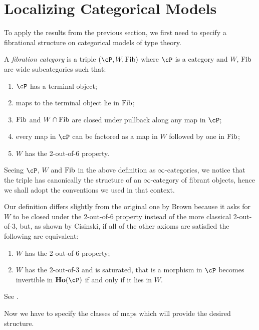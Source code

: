 \chapter{Localizing Categorical Models}

To apply the results from the previous section, we first need to specify a
fibrational structure on categorical models of type theory.

\begin{defn}
  A \emph{fibration category} is a triple $(\cP,W,\fib)$ where $\cP$ is a
  category and $W$, $\operatorname{Fib}$ are wide subcategories such that:
  \begin{enumerate}
    \item $\cP$ has a terminal object;
    \item maps to the terminal object lie in $\operatorname{Fib}$;
    \item $\operatorname{Fib}$ and $W\cap \operatorname{Fib}$ are closed under pullback along any map in $\cP$;
    \item every map in $\cP$ can be factored as a map in $W$ followed by one in
      $\operatorname{Fib}$;
    \item $W$ has the 2-out-of-6 property.
  \end{enumerate}
\end{defn}

\begin{rmk}
  Seeing $\cP$, $W$ and $\operatorname{Fib}$ in the above definition as $\infty$-categories, we
  notice that the triple has canonically the structure of an $\infty$-category
  of fibrant objects, hence we shall adopt the conventions we used in that
  context.
\end{rmk}

\begin{rmk}
  Our definition differs slightly from the original one by Brown
  because it asks for $W$ to be closed under the 2-out-of-6 property
  instead of the more classical 2-out-of-3, but, as shown by Cisinski, if all of
  the other axioms are satisfied the following are equivalent:
  \begin{enumerate}
    \item $W$ has the 2-out-of-6 property;
    \item $W$ has the 2-out-of-3 and is saturated, that is a morphism in $\cP$
      becomes invertible in $\ho(\cP)$ if and only if it lies in $W$.
  \end{enumerate}
  See \cite[Thm.~7.2.7]{RB06}.
\end{rmk}

Now we have to specify the classes of maps which will provide the desired
structure.

